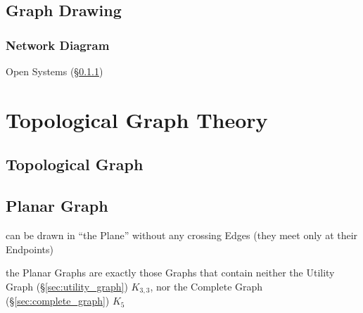 \subsection{Graph Drawing}\label{sec:graph_drawing}

\subsubsection{Network Diagram}\label{sec:network_diagram}


Open Systems (\S\ref{sec:network_diagram})



\section{Topological Graph Theory}\label{sec:topological_graph_theory}

\subsection{Topological Graph}\label{sec:topological_graph}




\subsection{Planar Graph}\label{sec:planar_graph}

can be drawn in ``the Plane'' without any crossing Edges (they meet only at
their Endpoints)


the Planar Graphs are exactly those Graphs that contain neither the Utility
Graph (\S\ref{sec:utility_graph}) $K_{3,3}$, nor the Complete Graph
(\S\ref{sec:complete_graph}) $K_5$

